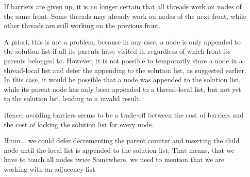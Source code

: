 If barriers are given up, it is no longer certain that all threads work on nodes of the same front.
Some threads may already work on nodes of the next front, while other threads are still working on the previous front.

A priori, this is not a problem, because in any case, a node is only appended to the solution list if all its parents have visited it, regardless of which front its parents belonged to.
However, it is not possible to temporarily store a node in a thread-local list and defer the appending to the solution list, as suggested earlier.
In this case, it would be possible that a node was appended to the solution list, while its parent node has only been appended to a thread-local list, but not yet to the solution list, leading to a invalid result.

Hence, avoiding barriers seems to be a trade-off between the cost of barriers and the cost of locking the solution list for every node.

\begin{invisible}
Hmm... we could defer decrementing the parent counter and inserting the child node until the local list is appended to the solution list. That means, that we have to touch all nodes twice
Somewhere, we need to mention that we are working with an adjacency list.
\end{invisible}